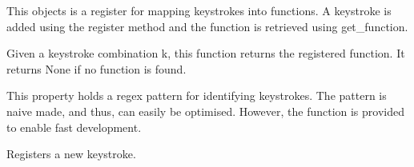 \documentclass[letterpaper,10pt,english]{sphinxmanual}
\begin{document}
\begin{fulllineitems}
\label{api/terminal:batchq.core.terminal.PatternRegister}
This objects is a register for mapping keystrokes into functions. A
keystroke is added using the register method and the function is
retrieved using get\_function.

\begin{fulllineitems}
\label{api/terminal:batchq.core.terminal.PatternRegister.get_function}
Given a keystroke combination k, this function returns the
registered function. It returns None if no function is found.

\end{fulllineitems}


\begin{fulllineitems}
\label{api/terminal:batchq.core.terminal.PatternRegister.re}
This property holds a regex pattern for identifying
keystrokes. The pattern is naive made, and thus, can easily be
optimised. However, the function is provided to enable fast
development.

\end{fulllineitems}


\begin{fulllineitems}
\label{api/terminal:batchq.core.terminal.PatternRegister.register}
Registers a new keystroke.

\end{fulllineitems}


\end{fulllineitems}

\end{document}
